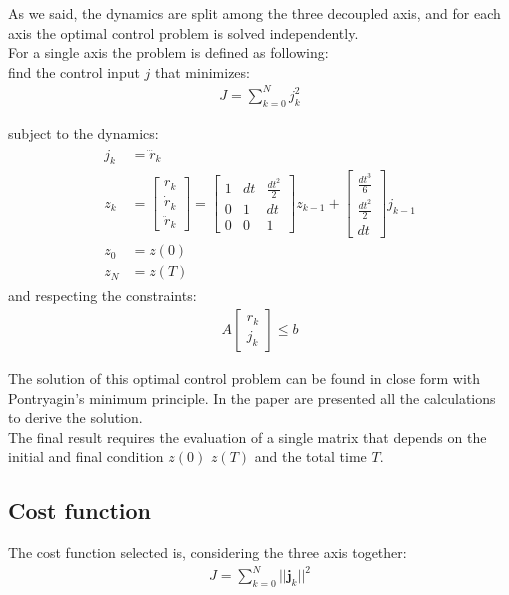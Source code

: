 As we said, the dynamics are split among the three decoupled axis, and for each axis the optimal control problem is  solved independently.\\

For a single axis the problem is defined as following:\\
find the control input $j$ that minimizes:
\begin{align}
J = \sum_{k=0}^N j_k^2
\end{align}

subject to the dynamics:
\begin{align}
\begin{split}
j_k &= \dddot{r}_k\\
z_k  &= 
{\begin{bmatrix}
 r_k \\[10pt]
 \dot{r}_k \\[10pt]
 \ddot{r}_k
\end{bmatrix}} = 
{\begin{bmatrix}
1 & dt & \frac{dt^2}{2}  \\[10pt]
0 & 1 & dt \\[10pt]
0 & 0 & 1
\end{bmatrix}}z_{k-1} + 
{\begin{bmatrix}
 \frac{dt^3}{6}  \\[10pt]
 \frac{dt^2}{2} \\[10pt]
 dt
\end{bmatrix}}j_{k-1} \\
z_0 &= z(0) \\
z_N &= z(T)
\end{split}
\end{align}
and respecting the constraints:
\begin{align}
A
{\begin{bmatrix}
 r_k \\[10pt]
j_k
\end{bmatrix}} \leq b
\end{align}

The solution of this optimal control problem can be found in close form with Pontryagin's minimum principle.
In the paper \cite{mueller2015computationally} are presented all the calculations to derive the solution.\\
The final result requires the evaluation of a single matrix that depends on the initial and final condition $z(0)$ $z(T)$ and the total time $T$.

\subsection{Cost function}
The cost function selected is, considering the three axis together:
\begin{align}
J = \sum_{k=0}^N ||\boldsymbol{j}_k||^2
\end{align}

